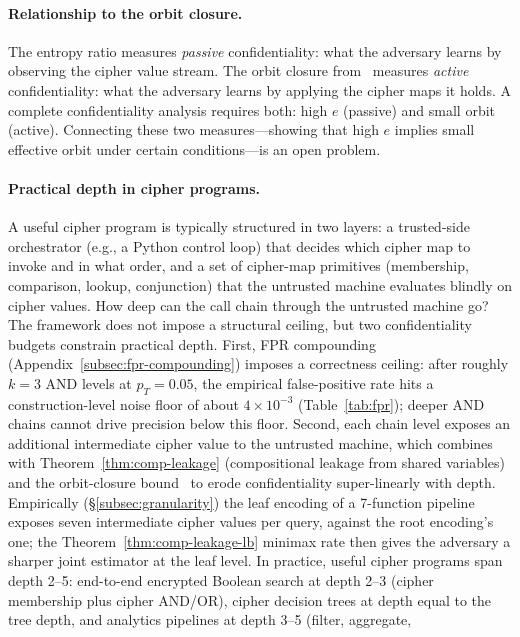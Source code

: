 \documentclass[conference]{IEEEtran}
\theoremstyle{definition}
\theoremstyle{plain}
\theoremstyle{remark}
\begin{document}
\paragraph{Relationship to the orbit closure.}
The entropy ratio measures \emph{passive} confidentiality: what the
adversary learns by observing the cipher value stream.  The orbit closure
from~\cite{towell2026algebraic} measures \emph{active} confidentiality:
what the adversary learns by applying the cipher maps it holds.  A
complete confidentiality analysis requires both: high $e$ (passive) and
small orbit (active).  Connecting these two measures---showing that high
$e$ implies small effective orbit under certain conditions---is an open
problem.

\paragraph{Practical depth in cipher programs.}
A useful cipher program is typically structured in two layers: a
trusted-side orchestrator (e.g., a Python control loop) that decides
which cipher map to invoke and in what order, and a set of cipher-map
primitives (membership, comparison, lookup, conjunction) that the
untrusted machine evaluates blindly on cipher values.  How deep can
the call chain through the untrusted machine go?  The framework does
not impose a structural ceiling, but two confidentiality budgets
constrain practical depth.  First, FPR compounding
(Appendix~\ref{subsec:fpr-compounding}) imposes a correctness ceiling:
after roughly $k = 3$ AND levels at $p_T = 0.05$, the empirical
false-positive rate hits a construction-level noise floor of about
$4 \times 10^{-3}$ (Table~\ref{tab:fpr}); deeper AND chains cannot
drive precision below this floor.  Second, each chain level exposes
an additional intermediate cipher value to the untrusted machine,
which combines with Theorem~\ref{thm:comp-leakage} (compositional
leakage from shared variables) and the orbit-closure
bound~\cite[Thm.~5.3]{towell2026algebraic} to erode confidentiality
super-linearly with depth.  Empirically (\S\ref{subsec:granularity})
the leaf encoding of a 7-function pipeline exposes seven
intermediate cipher values per query, against the root encoding's
one; the Theorem~\ref{thm:comp-leakage-lb} minimax rate then gives
the adversary a sharper joint estimator at the leaf level.  In
practice, useful cipher programs span depth 2--5: end-to-end
encrypted Boolean search at depth 2--3 (cipher membership plus
cipher AND/OR), cipher decision trees at depth equal to the tree
depth, and analytics pipelines at depth 3--5 (filter, aggregate,
\end{document}
